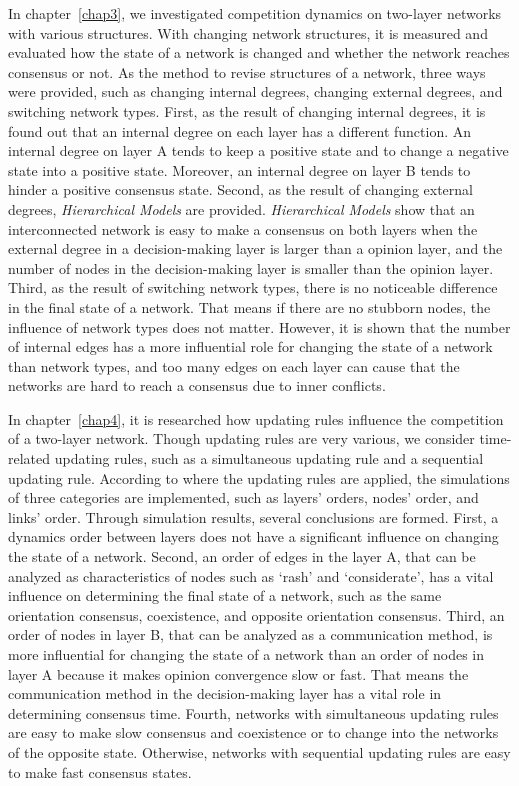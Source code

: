 In chapter~\ref{chap3}, we investigated competition dynamics on two-layer networks with various structures. With changing network structures, it is measured and evaluated how the state of a network is changed and whether the network reaches consensus or not. As the method to revise structures of a network, three ways were provided, such as changing internal degrees, changing external degrees, and switching network types. First, as the result of changing internal degrees, it is found out that an internal degree on each layer has a different function. An internal degree on layer A tends to keep a positive state and to change a negative state into a positive state. Moreover, an internal degree on layer B tends to hinder a positive consensus state. Second, as the result of changing external degrees, \textit{Hierarchical Models} are provided. \textit{Hierarchical Models} show that an interconnected network is easy to make a consensus on both layers when the external degree in a decision-making layer is larger than a opinion layer, and the number of nodes in the decision-making layer is smaller than the opinion layer. Third, as the result of switching network types, there is no noticeable difference in the final state of a network. That means if there are no stubborn nodes, the influence of network types does not matter. However, it is shown that the number of internal edges has a more influential role for changing the state of a network than network types, and too many edges on each layer can cause that the networks are hard to reach a consensus due to inner conflicts.

In chapter~\ref{chap4}, it is researched how updating rules influence the competition of a two-layer network. Though updating rules are very various, we consider time-related updating rules, such as a simultaneous updating rule and a sequential updating rule. According to where the updating rules are applied, the simulations of three categories are implemented, such as layers' orders,  nodes' order, and links' order. Through simulation results, several conclusions are formed. First, a dynamics order between layers does not have a significant influence on changing the state of a network. Second, an order of edges in the layer A, that can be analyzed as characteristics of nodes such as `rash' and `considerate', has a vital influence on determining the final state of a network, such as the same orientation consensus, coexistence, and opposite orientation consensus. Third, an order of nodes in layer B, that can be analyzed as a communication method, is more influential for changing the state of a network than an order of nodes in layer A because it makes opinion convergence slow or fast. That means the communication method in the decision-making layer has a vital role in determining consensus time. Fourth, networks with simultaneous updating rules are easy to make slow consensus and coexistence or to change into the networks of the opposite state. Otherwise, networks with sequential updating rules are easy to make fast consensus states.

